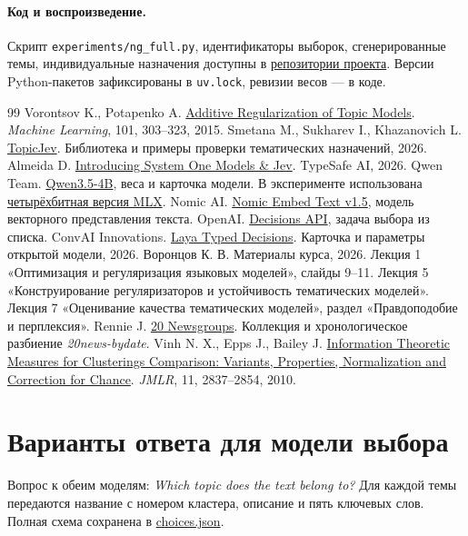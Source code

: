 \documentclass[11pt,a4paper]{article}
\begin{document}
\paragraph{Код и воспроизведение.}
Скрипт \texttt{experiments/ng\_full.py}, идентификаторы выборок, сгенерированные темы, индивидуальные назначения доступны в \href{https://github.com/fanis-khafizov/topicjev-benchmarking}{репозитории проекта}. Версии Python-пакетов зафиксированы в \texttt{uv.lock}, ревизии весов --- в коде.
\small
\begin{thebibliography}{99}
\setlength{\itemsep}{2pt}
 Vorontsov K., Potapenko A. \href{https://doi.org/10.1007/s10994-014-5476-6}{Additive Regularization of Topic Models}. \textit{Machine Learning}, 101, 303--323, 2015.
 Smetana M., Sukharev I., Khazanovich L. \href{https://github.com/anatems1/TopicJev/tree/e271339027555160e1a9dc2efa8fc6e71b1a5475}{TopicJev}. Библиотека и примеры проверки тематических назначений, 2026.
 Almeida D. \href{https://typesafe.ai/blog/introducing-system-one-models-and-jev}{Introducing System One Models \& Jev}. TypeSafe AI, 2026.
 Qwen Team. \href{https://huggingface.co/Qwen/Qwen3.5-4B}{Qwen3.5-4B}, веса и карточка модели. В эксперименте использована \href{https://huggingface.co/mlx-community/Qwen3.5-4B-4bit/tree/0e7ffd5c629ef7719d4cbc04069232580bfa9d9c}{четырёхбитная версия MLX}.
 Nomic AI. \href{https://huggingface.co/nomic-ai/nomic-embed-text-v1.5}{Nomic Embed Text v1.5}, модель векторного представления текста.
 OpenAI. \href{https://developers.openai.com/api/docs/guides/decisions}{Decisions API}, задача выбора из списка.
 ConvAI Innovations. \href{https://huggingface.co/convaiinnovations/laya-typed-decisions/tree/57d0994ab292b9dc1737f64ce31addae25a3c127}{Laya Typed Decisions}. Карточка и параметры открытой модели, 2026.
 Воронцов К. В. Материалы курса, 2026. Лекция 1 «Оптимизация и регуляризация языковых моделей», слайды 9--11. Лекция 5 «Конструирование регуляризаторов и устойчивость тематических моделей». Лекция 7 «Оценивание качества тематических моделей», раздел «Правдоподобие и перплексия».
 Rennie J. \href{http://qwone.com/~jason/20Newsgroups/}{20 Newsgroups}. Коллекция и хронологическое разбиение \textit{20news-bydate}.
 Vinh N. X., Epps J., Bailey J. \href{https://www.jmlr.org/papers/v11/vinh10a.html}{Information Theoretic Measures for Clusterings Comparison: Variants, Properties, Normalization and Correction for Chance}. \textit{JMLR}, 11, 2837--2854, 2010.
\end{thebibliography}
\clearpage\appendix
\section{Варианты ответа для модели выбора}
Вопрос к обеим моделям: \textit{Which topic does the text belong to?} Для каждой темы передаются название с номером кластера, описание и пять ключевых слов. Полная схема сохранена в \href{https://github.com/fanis-khafizov/topicjev-benchmarking/blob/main/results/ng-full/choices.json}{choices.json}.

\end{document}
